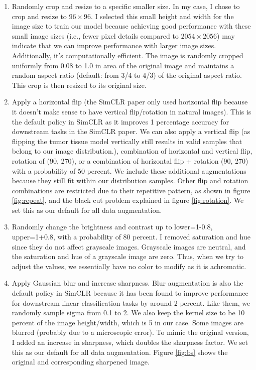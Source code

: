 \begin{enumerate}  
  \item Randomly crop and resize to a specific smaller size. In my case, I chose to crop and resize to $96 \times 96$. I selected this small height and width for the image size to train our model because achieving good performance with these small image sizes (i.e., fewer pixel details compared to $2054 \times 2056$) may indicate that we can improve performance with larger image sizes. Additionally, it's computationally efficient. The image is randomly cropped uniformly from 0.08 to 1.0 in area of the original image and maintains a random aspect ratio (default: from 3/4 to 4/3) of the original aspect ratio. This crop is then resized to its original size.

  \item Apply a horizontal flip (the SimCLR paper only used horizontal flip because it doesn't make sense to have vertical flip/rotation in natural images). This is the default policy in SimCLR as it improves 1 percentage accuracy for downstream tasks in the SimCLR paper. We can also apply a vertical flip (as flipping the tumor tissue model vertically still results in valid samples that belong to our image distribution.), combination of horizontal and vertical flip, rotation of (90, 270), or a combination of horizontal flip + rotation (90, 270) with a probability of 50 percent. We include these additional augmentations because they still fit within our distribution samples. Other flip and rotation combinations are restricted due to their repetitive pattern, as shown in figure \ref{fig:repeat}, and the black cut problem explained in figure \ref{fig:rotation}. We set this as our default for all data augmentation.

  \item Randomly change the brightness and contrast up to lower=1-0.8, upper=1+0.8, with a probability of 80 percent. I removed saturation and hue since they do not affect grayscale images. Grayscale images are neutral, and the saturation and hue of a grayscale image are zero. Thus, when we try to adjust the values, we essentially have no color to modify as it is achromatic.
   
  \item Apply Gaussian blur and increase sharpness. Blur augmentation is also the default policy in SimCLR because it has been found to improve performance for downstream linear classification tasks by around 2 percent. Like them, we randomly sample sigma from 0.1 to 2. We also keep the kernel size to be 10 percent of the image height/width, which is 5 in our case. Some images are blurred (probably due to a microscopic error). To mimic the original version, I added an increase in sharpness, which doubles the sharpness factor. We set this as our default for all data augmentation. Figure \ref{fig:bs} shows the original and corresponding sharpened image.  
\end{enumerate}

